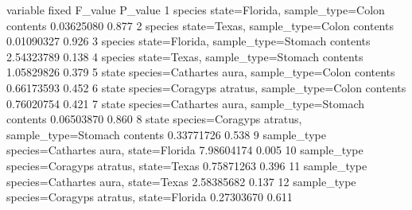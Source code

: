 \documentclass[
]{book}
\newenvironment{Shaded}{\begin{snugshade}}{\end{snugshade}}
\newcommand{\NormalTok}[1]{#1}
\begin{document}
\begin{Shaded}
\begin{Highlighting}[]
\NormalTok{      variable                                                  fixed    F\_value P\_value}
\NormalTok{1      species              state=Florida, sample\_type=Colon contents 0.03625080   0.877}
\NormalTok{2      species                state=Texas, sample\_type=Colon contents 0.01090327   0.926}
\NormalTok{3      species            state=Florida, sample\_type=Stomach contents 2.54323789   0.138}
\NormalTok{4      species              state=Texas, sample\_type=Stomach contents 1.05829826   0.379}
\NormalTok{5        state     species=Cathartes aura, sample\_type=Colon contents 0.66173593   0.452}
\NormalTok{6        state   species=Coragyps atratus, sample\_type=Colon contents 0.76020754   0.421}
\NormalTok{7        state   species=Cathartes aura, sample\_type=Stomach contents 0.06503870   0.860}
\NormalTok{8        state species=Coragyps atratus, sample\_type=Stomach contents 0.33771726   0.538}
\NormalTok{9  sample\_type                  species=Cathartes aura, state=Florida 7.98604174   0.005}
\NormalTok{10 sample\_type                  species=Coragyps atratus, state=Texas 0.75871263   0.396}
\NormalTok{11 sample\_type                    species=Cathartes aura, state=Texas 2.58385682   0.137}
\NormalTok{12 sample\_type                species=Coragyps atratus, state=Florida 0.27303670   0.611}
\end{Highlighting}
\end{Shaded}
\end{document}
